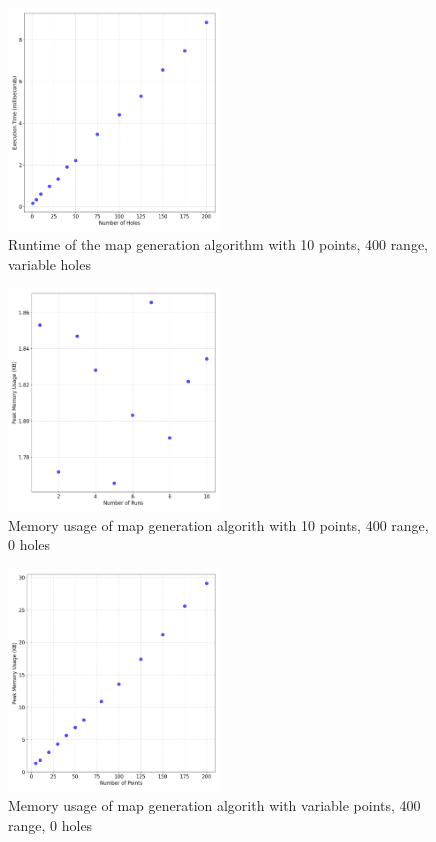\documentclass[final]{cmpreport_02}
\begin{document}
\begin{figure}[h!]
	\centering
	\includegraphics[width=0.5\textwidth]{./images/mapGenHolesRT.png}
	\caption{Runtime of the map generation algorithm with 10 points, 400 range, variable holes}
	\label{PE:mg:holes}
\end{figure}

\begin{figure}[h!]
	\centering
	\includegraphics[width=0.5\textwidth]{./images/mapGenBaselineMem.png}
	\caption{Memory usage of map generation algorith with 10 points, 400 range, 0 holes}
	\label{PE:mg:memBaseline}
\end{figure}

\begin{figure}[h!]
	\centering
	\includegraphics[width=0.5\textwidth]{./images/mapGenPointsMem.png}
	\caption{Memory usage of map generation algorith with variable points, 400 range, 0 holes}
	\label{PE:mg:memPoints}
\end{figure}
\end{document}
